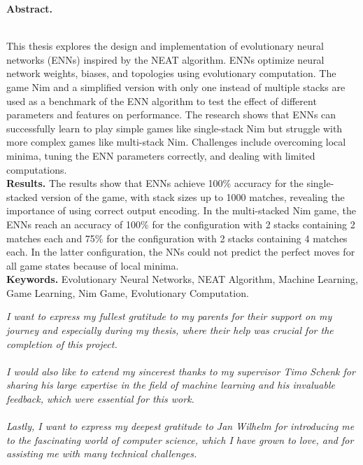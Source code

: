 \documentclass[12pt]{report}
\begin{document}
    \begin{doublespace}
        \begin{center}
            \textbf{Abstract.}
        \end{center}
        \\
        This thesis explores the design and implementation of evolutionary neural networks (ENNs) inspired by the NEAT algorithm.
        ENNs optimize neural network weights, biases, and topologies using evolutionary computation.
        The game Nim and a simplified version with only one instead of multiple stacks are used as a benchmark of the ENN algorithm to test the effect of different parameters and features on performance.
        The research shows that ENNs can successfully learn to play simple games like single-stack Nim but struggle with more complex games like multi-stack Nim.
        Challenges include overcoming local minima, tuning the ENN parameters correctly, and dealing with limited computations.
        \\
        \textbf{Results.}
        The results show that ENNs achieve 100\% accuracy for the single-stacked version of the game, with stack sizes up to 1000 matches, revealing the importance of using correct output encoding.
        In the multi-stacked Nim game, the ENNs reach an accuracy of 100\% for the configuration with 2 stacks containing 2 matches each and 75\% for the configuration with 2 stacks containing 4 matches each.
        In the latter configuration, the NNs could not predict the perfect moves for all game states because of local minima.
        \\
        \textbf{Keywords.}
        Evolutionary Neural Networks, NEAT Algorithm, Machine Learning, Game Learning, Nim Game, Evolutionary Computation.

        \newpage
        \vspace*{5em}
        \begin{adjustwidth}{2cm}{2cm}
            \textit{
                I want to express my fullest gratitude to my parents for their support on my journey and especially during my thesis, where their help was crucial for the completion of this project.
                \\ \\
                I would also like to extend my sincerest thanks to my supervisor Timo Schenk for sharing his large expertise in the field of machine learning and his invaluable feedback, which were essential for this work.
                \\ \\
                Lastly, I want to express my deepest gratitude to Jan Wilhelm for introducing me to the fascinating world of computer science, which I have grown to love, and for assisting me with many technical challenges.
            }
        \end{adjustwidth}
    \end{doublespace}
    \newpage
\end{document}
